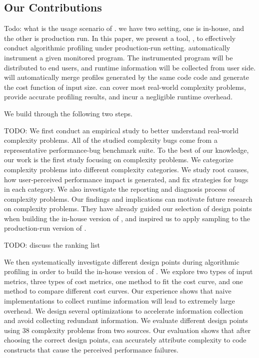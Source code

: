 \subsection{Our Contributions}
\label{sec:con}

{\color{red} Todo: what is the usage scenario of \Tool. we have two setting, one is in-house, and the other is production run. }
In this paper,
we present a tool, \Tool, to effectively conduct algorithmic profiling 
under production-run setting.
\Tool automatically instrument a given monitored program.
The instrumented program will be distributed to end users, 
and runtime information will be collected from user side. 
\Tool will automatically merge profiles generated by the same code code 
and generate the cost function of input size. 
\Tool can cover most real-world complexity problems, 
provide accurate profiling results, and incur a negligible runtime overhead. 

We build \Tool through the following two steps.

{\color{red} TODO:}
We first conduct an empirical study to better understand
real-world complexity problems.
All of the studied complexity bugs come from a representative
performance-bug benchmark suite\cite{PerfBug,SongOOPSLA2014}.
To the best of our knowledge, our work is the first study focusing on complexity problems.
We categorize complexity problems into different complexity categories.
We study root causes,
how user-perceived performance impact is generated,
and fix strategies for bugs in each category.
We also investigate the reporting and diagnosis process of complexity problems.
Our findings and implications can motivate future research on complexity problems.
They have already guided our selection of design points when building the in-house version of \Tool,
and inspired us to apply sampling to the production-run version of \Tool.


{\color{red} TODO: discuss the ranking list}

We then systematically investigate different design points during algorithmic profiling
in order to build the in-house version of \Tool.
We explore two types of input metrics,
three types of cost metrics,
one method to fit the cost curve,
and one method to compare different cost curves.
Our experience shows that naive implementations
to collect runtime information
will lead to extremely large overhead.
We design several optimizations to accelerate information collection
and avoid collecting redundant information.
We evaluate different design points
using $38$ complexity problems from two sources.
Our evaluation shows that after choosing the correct design points,
\Tool can accurately attribute complexity to code constructs
that cause the perceived performance failures.
\fi



